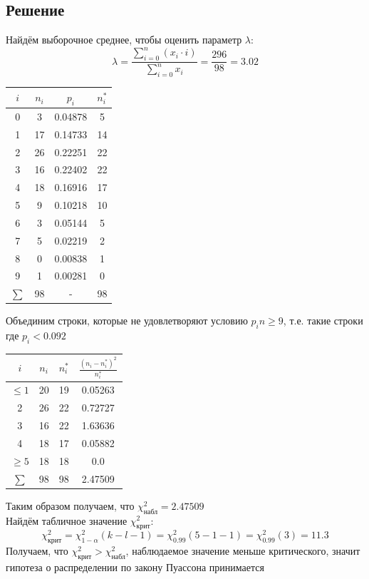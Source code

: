 \documentclass[12pt,a4paper]{report}
\begin{document}
\subsection*{Решение}
Найдём выборочное среднее, чтобы оценить параметр $\lambda$:
$$\lambda=\frac{\sum_{i=0}^{n}(x_i\cdot i)}{\sum_{i=0}^{n}x_i}=\frac{296}{98}=3.02$$
\hfill\break
\begin{center}
    \begin{tabular}{|c|c|c|c|}
        \hline
        $i$ & $n_i$ & $p_i$ & $n_i^*$ \\
        \hline
        0 & 3 & 0.04878 & 5 \\
        \hline
        1 & 17 & 0.14733 & 14 \\ %
        \hline
        2 & 26 & 0.22251 & 22 \\
        \hline
        3 & 16 & 0.22402 & 22 \\
        \hline
        4 & 18 & 0.16916 & 17 \\
        \hline
        5 & 9 & 0.10218 & 10 \\
        \hline
        6 & 3 & 0.05144 & 5 \\
        \hline
        7 & 5 & 0.02219 & 2 \\
        \hline
        8 & 0 & 0.00838 & 1 \\
        \hline
        9 & 1 & 0.00281 & 0 \\
        \hline
        $\sum$ & 98 & - & 98 \\
        \hline
    \end{tabular}
\end{center}
Объединим строки, которые не удовлетворяют условию $p_in\geq 9$, т.е. такие строки где $p_i < 0.092$
\begin{center}
    \begin{tabular}{|c|c|c|c|}
        \hline
        $i$ & $n_i$ & $n_i^*$ & $\frac{(n_i-n_i^*)^2}{n_i^*}$ \\
        \hline
        $\leq 1$ & 20 & 19 & 0.05263 \\
        \hline
        2 & 26 & 22 & 0.72727 \\
        \hline
        3 & 16 & 22 & 1.63636 \\
        \hline
        4 & 18 & 17 & 0.05882 \\
        \hline
        $\geq 5$ & 18 & 18 & 0.0 \\
        \hline
        $\sum$ & 98 & 98 & 2.47509 \\
        \hline
    \end{tabular}
\end{center}
Таким образом получаем, что $\chi^2_\text{набл}=2.47509$\\
\hfill\break
Найдём табличное значение $\chi^2_\text{крит}$:
$$\chi^2_\text{крит}=\chi^2_{1-\alpha}(k-l-1)=\chi^2_{0.99}(5-1-1)=\chi^2_{0.99}(3)=11.3$$
\hfill\break
Получаем, что $\chi^2_\text{крит} > \chi^2_\text{набл}$, наблюдаемое значение меньше критического, значит гипотеза о распределении по закону Пуассона принимается
\end{document}
